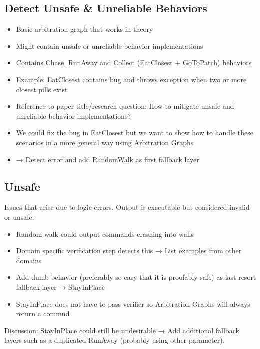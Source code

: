 \subsection{Detect Unsafe \& Unreliable Behaviors}
\begin{itemize}
    \item Basic arbitration graph that works in theory
    \item Might contain unsafe or unreliable behavior implementations
    \item Contains Chase, RunAway and Collect (EatClosest + GoToPatch) behaviors
    \item Example: EatClosest contains bug and throws exception when two or more closest pills exist
    \item Reference to paper title/research question: How to mitigate unsafe and unreliable behavior implementations?
    \item We could fix the bug in EatClosest but we want to show how to handle these scenarios in a more general way using Arbitration Graphs
    \item → Detect error and add RandomWalk as first fallback layer
\end{itemize}

\subsection{Unsafe}
Issues that arise due to logic errors. Output is executable but considered invalid or unsafe.
\begin{itemize}
    \item Random walk could output commands crashing into walls
    \item Domain specific verification step detects this → List examples from other domains
    \item Add dumb behavior (preferably so easy that it is proofably safe) as last resort fallback layer → StayInPlace
    \item StayInPlace does not have to pass verifier so Arbitration Graphs will always return a commnd
\end{itemize}
Discussion: StayInPlace could still be undesirable → Add additional fallback layers such as a duplicated RunAway (probably using other parameter).

